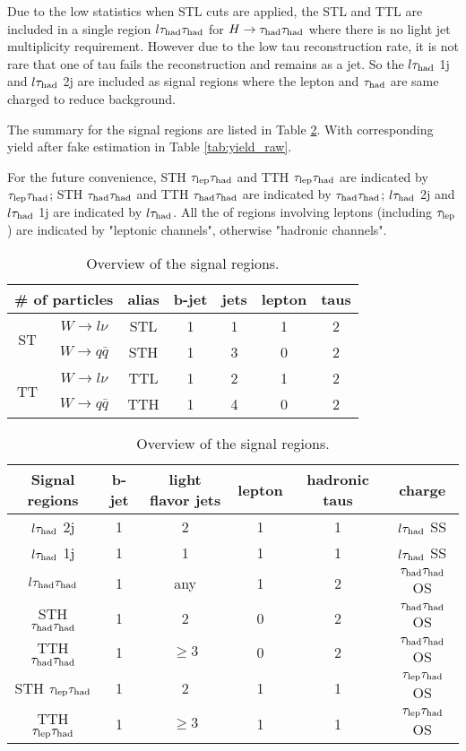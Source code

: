 Due to the low statistics when STL cuts are applied, the STL and TTL are included in a single region $l\tau_\text{had}{}\tau_\text{had}$ for $H\to\tau_\text{had}{}\tau_\text{had}$ where there is no light jet multiplicity requirement. However due to the low tau reconstruction rate, it is not rare that one of tau fails the reconstruction and remains as a jet. So the $l\tau_\text{had}$ 1j and $l\tau_\text{had}$ 2j are included as signal regions where the lepton and $\tau_\text{had}$ are same charged to reduce background.

The summary for the signal regions are listed in Table \ref{tab:signalregions}. With corresponding yield after fake estimation in Table \ref{tab:yield_raw}.

For the future convenience, STH $\tau_\text{lep}{}\tau_\text{had}$ and TTH $\tau_\text{lep}{}\tau_\text{had}$ are indicated by $\tau_\text{lep}{}\tau_\text{had}$; STH $\tau_\text{had}{}\tau_\text{had}$ and TTH $\tau_\text{had}{}\tau_\text{had}$ are indicated by $\tau_\text{had}{}\tau_\text{had}$; $l\tau_\text{had}$ 2j and $l\tau_\text{had}$ 1j are indicated by $l\tau_\text{had}$. All the of regions involving leptons (including $\tau_\text{lep}$) are indicated by "leptonic channels", otherwise "hadronic channels".

\begin{table}
\footnotesize
\centering
\caption{Overview of the final states of signal events.}
\label{tab:signalevents}
\begin{tabular}[h]{c|c|c|c|c|c|c}
\hline \hline

\multicolumn{2}{c|}{\# of particles}	& alias & b-jet & jets & lepton & taus\\ \hline
\multirow{2}{*}{ST}	& $W\to l\nu$		& STL   & 1	    & 1    & 1      & 2   \\ \cline{2-7}
					& $W\to q\bar{q}$	& STH   & 1	    & 3    & 0      & 2   \\ \hline
\multirow{2}{*}{TT}	& $W\to l\nu$		& TTL   & 1	    & 2    & 1      & 2   \\ \cline{2-7}
					& $W\to q\bar{q}$	& TTH   & 1	    & 4    & 0      & 2   \\ \hline
\end{tabular}
\footnotesize
\centering
\caption{Overview of the signal regions.}
\label{tab:signalregions}
\begin{tabular}[h]{c|c|c|c|c|c}
\hline \hline
Signal regions & b-jet & light flavor jets	& lepton & hadronic taus & charge\\ \hline
$l\tau_\text{had}$ 2j  & 1     & 2					& 1      & 1			 & $l\tau_\text{had}$ SS\\ \hline
$l\tau_\text{had}$ 1j  & 1     & 1					& 1      & 1			 & $l\tau_\text{had}$ SS\\ \hline
$l\tau_\text{had}{}\tau_\text{had}$	   & 1     & any				& 1      & 2             & $\tau_\text{had}{}\tau_\text{had}$ OS\\ \hline
STH $\tau_\text{had}{}\tau_\text{had}$ & 1     & 2      			& 0      & 2             & $\tau_\text{had}{}\tau_\text{had}$ OS\\ \hline
TTH $\tau_\text{had}{}\tau_\text{had}$ & 1     & $\ge3$ 			& 0      & 2             & $\tau_\text{had}{}\tau_\text{had}$ OS\\ \hline
STH $\tau_\text{lep}{}\tau_\text{had}$   & 1     & 2      			& 1      & 1             & $\tau_\text{lep}{}\tau_\text{had}$ OS\\ \hline
TTH $\tau_\text{lep}{}\tau_\text{had}$   & 1     & $\ge3$ 			& 1      & 1             & $\tau_\text{lep}{}\tau_\text{had}$ OS\\ \hline
\end{tabular}
\end{table}


